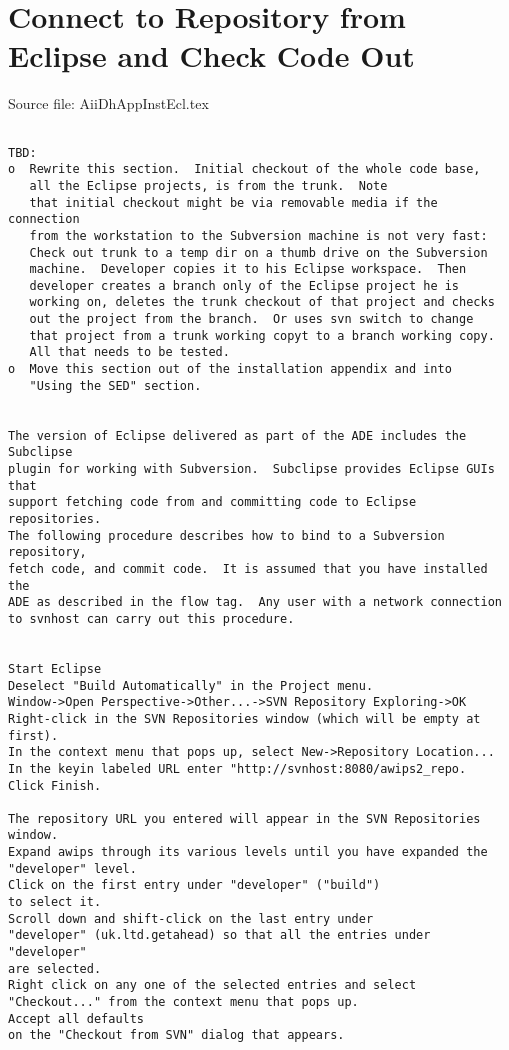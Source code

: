 
\section{Connect to Repository from Eclipse and Check Code Out}

Source file: AiiDhAppInstEcl.tex

\begin{verbatim}

TBD:
o  Rewrite this section.  Initial checkout of the whole code base,
   all the Eclipse projects, is from the trunk.  Note
   that initial checkout might be via removable media if the connection
   from the workstation to the Subversion machine is not very fast:
   Check out trunk to a temp dir on a thumb drive on the Subversion 
   machine.  Developer copies it to his Eclipse workspace.  Then
   developer creates a branch only of the Eclipse project he is 
   working on, deletes the trunk checkout of that project and checks
   out the project from the branch.  Or uses svn switch to change
   that project from a trunk working copyt to a branch working copy.
   All that needs to be tested.
o  Move this section out of the installation appendix and into 
   "Using the SED" section.


The version of Eclipse delivered as part of the ADE includes the Subclipse
plugin for working with Subversion.  Subclipse provides Eclipse GUIs that
support fetching code from and committing code to Eclipse repositories.
The following procedure describes how to bind to a Subversion repository,
fetch code, and commit code.  It is assumed that you have installed the
ADE as described in the flow tag.  Any user with a network connection
to svnhost can carry out this procedure.


Start Eclipse
Deselect "Build Automatically" in the Project menu.
Window->Open Perspective->Other...->SVN Repository Exploring->OK
Right-click in the SVN Repositories window (which will be empty at first).
In the context menu that pops up, select New->Repository Location...
In the keyin labeled URL enter "http://svnhost:8080/awips2_repo.
Click Finish.

The repository URL you entered will appear in the SVN Repositories window.
Expand awips through its various levels until you have expanded the
"developer" level.  
Click on the first entry under "developer" ("build")
to select it.  
Scroll down and shift-click on the last entry under
"developer" (uk.ltd.getahead) so that all the entries under "developer"
are selected.  
Right click on any one of the selected entries and select
"Checkout..." from the context menu that pops up.  
Accept all defaults
on the "Checkout from SVN" dialog that appears.

\end{verbatim}


